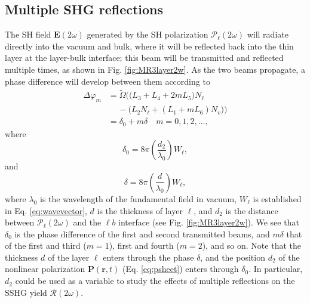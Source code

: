 \documentclass[aps,prb,10pt,showpacs,letterpaper,twocolumn]{revtex4-1}
\begin{document}
\subsection{Multiple SHG reflections}\label{sec:multiple2w}

The SH field $\mathbf{E}(2\omega)$ generated by the SH polarization
$\boldsymbol{\mathcal{P}}_{\ell}(2\omega)$ will radiate directly into the vacuum
and bulk, where it will be reflected back into the thin layer at the layer-bulk
interface; this beam will be transmitted and reflected multiple times, as shown
in Fig. \ref{fig:MR3layer2w}. As the two beams propagate, a phase difference
will develop between them according to
\begin{equation}\label{eq:m99}
\begin{split}
\Delta\varphi_{m} 
&= \tilde{\Omega}
\Big(
\big(L_{3} + L_{4} + 2mL_{5}\big)N_{\ell}\\
 &\hspace{14pt}- \big(L_{2}N_{\ell} + (L_{1} + mL_{6})N_{v}\big)
\Big)\\
&= \delta_{0} + m\delta\quad m=0,1,2,\ldots,
\end{split}
\end{equation}
where
\begin{equation}\label{eq:delta0}
\delta_{0} =
8\pi\left(\frac{d_{2}}{\lambda_{0}}\right)W_{\ell},
\end{equation}
and
\begin{equation}\label{eq:delta}
\delta = 8\pi
\left(\frac{d}{\lambda_{0}}\right)W_{\ell},
\end{equation}
where $\lambda_{0}$ is the wavelength of the fundamental field in vacuum,
$W_{\ell}$ is established in Eq. \eqref{eq:wavevector}, $d$ is the thickness of
layer $\ell$, and $d_{2}$ is the distance between
$\boldsymbol{\mathcal{P}}_{\ell}(2\omega)$ and the $\ell b$ interface (see Fig.
\ref{fig:MR3layer2w}). We see that $\delta_{0}$ is the phase difference of the
first and second transmitted beams, and $m\delta$ that of the first and third
($m = 1$), first and fourth ($m = 2$), and so on. Note that the thickness $d$ of
the layer $\ell$ enters through the phase $\delta$, and the position $d_{2}$ of
the nonlinear polarization $\mathbf{P}(\mathbf{r},t)$ (Eq. \eqref{eq:psheet})
enters through $\delta_{0}$. In particular, $d_{2}$ could be used as a variable
to study the effects of multiple reflections on the SSHG yield
$\mathcal{R}(2\omega)$.
\end{document}
